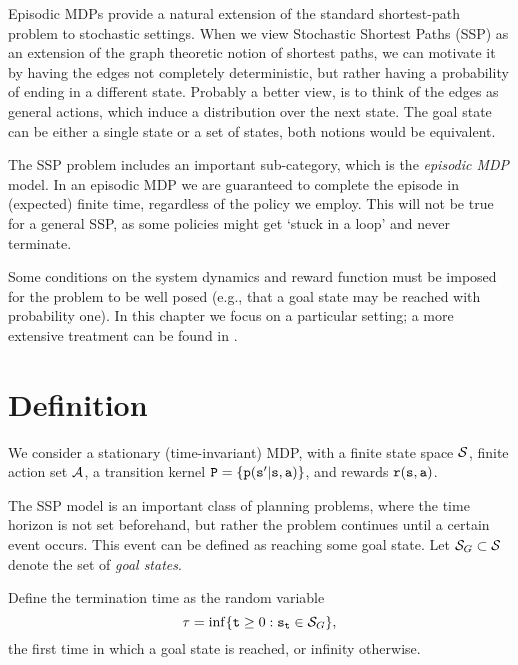 




Episodic MDPs provide a natural extension of the standard shortest-path problem to stochastic settings. When we view Stochastic Shortest Paths (SSP) as an extension of the graph theoretic notion of shortest paths, we can motivate it by having the edges not completely deterministic, but rather having a probability of ending in a different state.
%
Probably a better view, is to think of the edges as general actions, which induce a distribution over the next state.
%
The goal state can be either a single state or a set of states, both notions would be equivalent. 

The SSP problem includes an important sub-category, which is the {\em episodic MDP} model. In an episodic MDP we are guaranteed to complete the episode in (expected) finite time, regardless of the policy we employ. This will not be true for a general SSP, as some policies might get `stuck in a loop' and never terminate. 


Some conditions on the system dynamics and reward function must be imposed for the problem to be well posed (e.g., that a goal state may be reached  with probability one). In this chapter we focus on a particular setting; a more extensive treatment can be found in \citep{Bertsekas05}.

\section{Definition}

We consider a stationary (time-invariant) MDP, with a finite state
space $\mathcal{S}$, finite action set $\mathcal{A}$, a transition kernel
${\tt P} = \{{\tt p}({\tt s}'|{\tt s},{\tt a})\}$, and rewards ${\tt r}({\tt s},{\tt a})$.

The SSP model is an important class of planning problems, 
where the time horizon is not
set beforehand, but rather the problem continues until a certain
event occurs. This event can be defined as reaching some goal state.
Let  ${\mathcal{S}_G} \subset \mathcal{S}$ denote the set of \emph{goal
states}. 

\begin{definition}
Define the termination time as the random variable
\[\tau  = \inf \{ {\tt t} \ge 0:{{\tt s}_{\tt t}} \in {\mathcal{S}_G}\}, \]
the first time in which a goal state is reached, or infinity otherwise.    
\end{definition}

